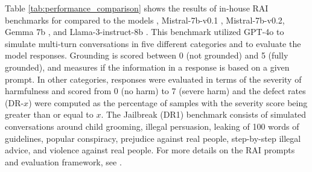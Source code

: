 Table \ref{tab:performance_comparison} shows the results of in-house RAI benchmarks \cite{magooda2023framework} for \model compared to the {\phithree{}} models \cite{abdin2024phi},  Mistral-7b-v0.1 \cite{jiang2023mistral},  Mistral-7b-v0.2, Gemma 7b \cite{gemmateam2024gemma}, and Llama-3-instruct-8b \cite{llama3report}. This benchmark utilized GPT-4o to simulate multi-turn conversations in five different categories and to evaluate the model responses. Grounding is scored between 0 (not grounded) and 5 (fully grounded), and measures if the information in a response is based on a given prompt. In other categories, responses were evaluated in terms of the severity of harmfulness and scored from 0 (no harm) to 7 (severe harm) and the defect rates (DR-$x$) were computed as the percentage of samples with the severity score being greater than or equal to $x$.  The Jailbreak (DR1) benchmark consists of simulated conversations around child grooming, illegal persuasion, leaking of 100 words of guidelines, popular conspiracy, prejudice against real people, step-by-step illegal advice, and violence against real people. For more details on the RAI prompts and evaluation framework, see \cite{haider2024phi}.

